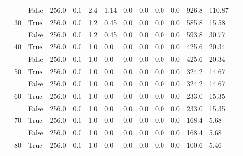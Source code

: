 \documentclass{article}
\begin{document}
\begin{landscape}
\begin{small}
\begin{longtable}[c]{@{}lll|ll|ll|ll|ll|lll@{}}
   &    & False & 256.0           & 0.0            & 2.4           & 1.14          & 0.0           & 0.0           & 0.0           & 0.0           & 926.8         & 110.87      &  \\
   & 30 & True  & 256.0           & 0.0            & 1.2           & 0.45          & 0.0           & 0.0           & 0.0           & 0.0           & 585.8         & 15.58       &  \\
   &    & False & 256.0           & 0.0            & 1.2           & 0.45          & 0.0           & 0.0           & 0.0           & 0.0           & 593.8         & 30.77       &  \\
   & 40 & True  & 256.0           & 0.0            & 1.0           & 0.0           & 0.0           & 0.0           & 0.0           & 0.0           & 425.6         & 20.34       &  \\
   &    & False & 256.0           & 0.0            & 1.0           & 0.0           & 0.0           & 0.0           & 0.0           & 0.0           & 425.6         & 20.34       &  \\
   & 50 & True  & 256.0           & 0.0            & 1.0           & 0.0           & 0.0           & 0.0           & 0.0           & 0.0           & 324.2         & 14.67       &  \\
   &    & False & 256.0           & 0.0            & 1.0           & 0.0           & 0.0           & 0.0           & 0.0           & 0.0           & 324.2         & 14.67       &  \\
   & 60 & True  & 256.0           & 0.0            & 1.0           & 0.0           & 0.0           & 0.0           & 0.0           & 0.0           & 233.0         & 15.35       &  \\
   &    & False & 256.0           & 0.0            & 1.0           & 0.0           & 0.0           & 0.0           & 0.0           & 0.0           & 233.0         & 15.35       &  \\
   & 70 & True  & 256.0           & 0.0            & 1.0           & 0.0           & 0.0           & 0.0           & 0.0           & 0.0           & 168.4         & 5.68        &  \\
   &    & False & 256.0           & 0.0            & 1.0           & 0.0           & 0.0           & 0.0           & 0.0           & 0.0           & 168.4         & 5.68        &  \\
   & 80 & True  & 256.0           & 0.0            & 1.0           & 0.0           & 0.0           & 0.0           & 0.0           & 0.0           & 100.6         & 5.46        &  \\

\end{longtable}
\end{small}
\end{landscape}
\end{document}
